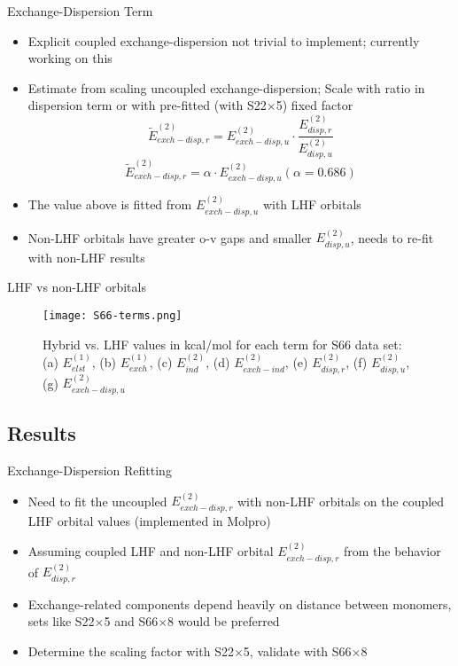 \documentclass{beamer}
\begin{document}
        \begin{frame}{Exchange-Dispersion Term}
            \begin{itemize}
                \item Explicit coupled exchange-dispersion not trivial to implement; currently working on this
                \item Estimate from scaling uncoupled exchange-dispersion; Scale with ratio in dispersion term or with pre-fitted (with S22$\times$5) fixed factor 
                $$\tilde{E}^{(2)}_{exch-disp,r} = E^{(2)}_{exch-disp,u} \cdot \frac{E^{(2)}_{disp,r}}{E^{(2)}_{disp,u}}$$
                $$\tilde{E}^{(2)}_{exch-disp,r} = \alpha \cdot E^{(2)}_{exch-disp,u} (\alpha = 0.686)$$
                \item The value above is fitted from $E_{exch-disp,u}^{(2)}$ with LHF orbitals
                \item Non-LHF orbitals have greater o-v gaps and smaller $E_{disp,u}^{(2)}$, needs to re-fit with non-LHF results
            \end{itemize}
        \end{frame}

        \begin{frame}{LHF vs non-LHF orbitals}
            \begin{figure}
            \centering
            \texttt{[image: S66-terms.png]}
            \caption{Hybrid vs. LHF values in kcal/mol for each term for S66 data set: (a) $E_{elst}^{(1)}$, (b) $E_{exch}^{(1)}$, (c) $E_{ind}^{(2)}$, (d) $E_{exch-ind}^{(2)}$, (e) $E_{disp,r}^{(2)}$, (f) $E_{disp,u}^{(2)}$, (g) $E_{exch-disp,u}^{(2)}$} 
            \end{figure}        
        \end{frame}

    \subsection{Results}
    
        \begin{frame}{Exchange-Dispersion Refitting}
            \begin{itemize}
                \item Need to fit the uncoupled $E_{exch-disp,r}^{(2)}$ with non-LHF orbitals on the coupled LHF orbital values (implemented in Molpro)
                \item Assuming coupled LHF and non-LHF orbital $E_{exch-disp,r}^{(2)}$ from the behavior of $E_{disp,r}^{(2)}$
                \item Exchange-related components depend heavily on distance between monomers, sets like S22$\times$5 and S66$\times$8 would be preferred
                \item Determine the scaling factor with S22$\times$5, validate with S66$\times$8 
            \end{itemize}
        \end{frame}
\end{document}
